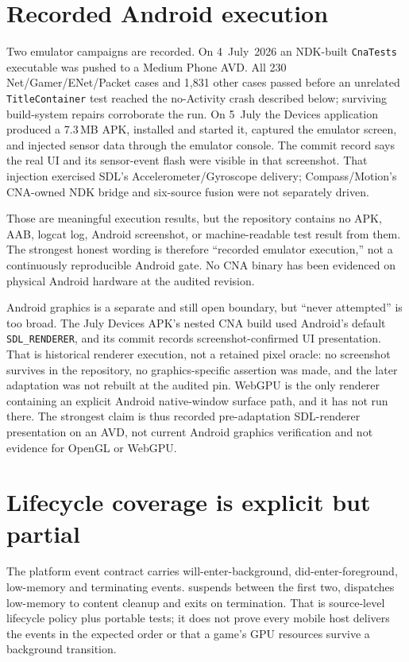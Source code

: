 \section{Recorded Android execution}

Two emulator campaigns are recorded. On 4~July~2026 an NDK-built \texttt{CnaTests} executable
was pushed to a Medium Phone AVD. All 230 Net/Gamer/ENet/Packet cases and 1,831 other cases passed
before an unrelated \texttt{TitleContainer} test reached the no-Activity crash described below;
surviving build-system repairs corroborate the run. On 5~July the Devices application produced a
7.3\,MB APK, installed and started it, captured the emulator screen, and injected sensor data
through the emulator console. The commit record says the real UI and its sensor-event flash were
visible in that screenshot. That injection exercised SDL's Accelerometer/Gyroscope delivery;
Compass/Motion's CNA-owned NDK bridge and six-source fusion were not separately driven.

Those are meaningful execution results, but the repository contains no APK, AAB, logcat log,
Android screenshot, or machine-readable test result from them.  The strongest honest wording is
therefore ``recorded emulator execution,'' not a continuously reproducible Android gate.  No CNA
binary has been evidenced on physical Android hardware at the audited revision.

Android graphics is a separate and still open boundary, but ``never attempted'' is too broad. The
July Devices APK's nested CNA build used Android's default \texttt{SDL\_RENDERER}, and its commit
records screenshot-confirmed UI presentation. That is historical renderer execution, not a
retained pixel oracle: no screenshot survives in the repository, no graphics-specific assertion
was made, and the later adaptation was not rebuilt at the audited pin. WebGPU is the only renderer
containing an explicit Android native-window surface path, and it has not run there. The strongest
claim is thus recorded pre-adaptation SDL-renderer presentation on an AVD, not current Android
graphics verification and not evidence for OpenGL or WebGPU.

\section{Lifecycle coverage is explicit but partial}

The platform event contract carries will-enter-background, did-enter-foreground, low-memory and
terminating events.   suspends between the first two, dispatches low-memory to
content cleanup and exits on termination.  That is source-level lifecycle policy plus portable
tests; it does not prove every mobile host delivers the events in the expected order or that a
game's GPU resources survive a background transition.

